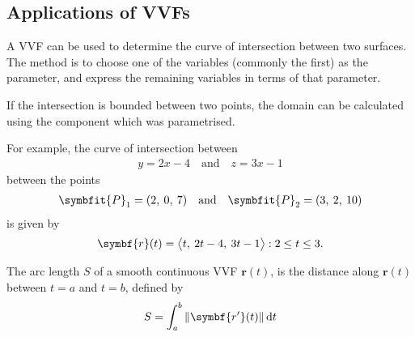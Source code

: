 \documentclass{article}
\begin{document}
\subsection{Applications of VVFs}
\begin{theorem}
    A VVF can be used to determine the curve of intersection between two
    surfaces. The method is to choose one of the variables (commonly the first)
    as the parameter, and express the remaining variables in terms of that parameter.

    If the intersection is bounded between two points, the domain can be
    calculated using the component which was parametrised.

    For example, the curve of intersection between
    \begin{align*}
        y = 2x - 4 \quad \text{and} \quad z = 3x - 1
    \end{align*}
    between the points
    \begin{align*}
        \symbfit{P}_1 = (2,\: 0,\: 7) \quad \text{and} \quad \symbfit{P}_2 = (3,\: 2,\: 10)
    \end{align*}
    is given by
    \begin{equation*}
        \symbf{r}(t) = \avec[\big]{t,\: 2t - 4,\: 3t - 1} : 2 \leq t \leq 3.
    \end{equation*}
\end{theorem}
\begin{definition}
    The arc length $S$ of a smooth continuous VVF $\symbf{r}(t)$, is the distance along $\symbf{r}(t)$
    between $t=a$ and $t=b$, defined by
    \begin{equation*}
        S = \int_a^b \norm{\symbf{r'}(t)} \dd{t}
    \end{equation*}
\end{definition}
\newpage
\end{document}
